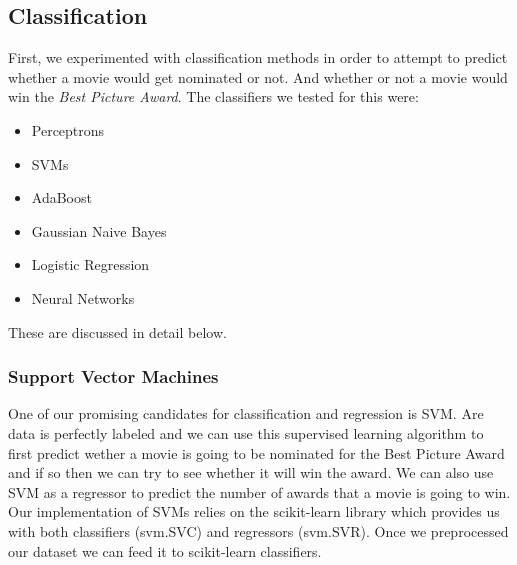 \documentclass[journal,transmag]{IEEEtran}
\begin{document}
		\subsection{Classification}
			First, we experimented with classification methods in order to attempt to predict whether a movie would get nominated or not. And whether or not a movie would win the \emph{Best Picture Award}. The classifiers we tested for this were:
			\begin{itemize}
				\item Perceptrons
				\item SVMs
				\item AdaBoost
				\item Gaussian Naive Bayes
				\item Logistic Regression
				\item Neural Networks
			\end{itemize}
			These are discussed in detail below.
		
			\subsubsection{Support Vector Machines}
			
			One of our promising candidates for classification and regression is SVM. Are data is perfectly labeled and we can use this supervised learning algorithm to first predict wether a movie is going to be nominated for the Best Picture Award and if so then we can try to see whether it will win the award. We can also use SVM as a regressor to predict the number of awards that a movie is going to win.\\ 
Our implementation of SVMs relies on the scikit-learn library which provides us with both classifiers (svm.SVC) and regressors (svm.SVR). Once we preprocessed our dataset we can feed it to scikit-learn classifiers.
\end{document}
